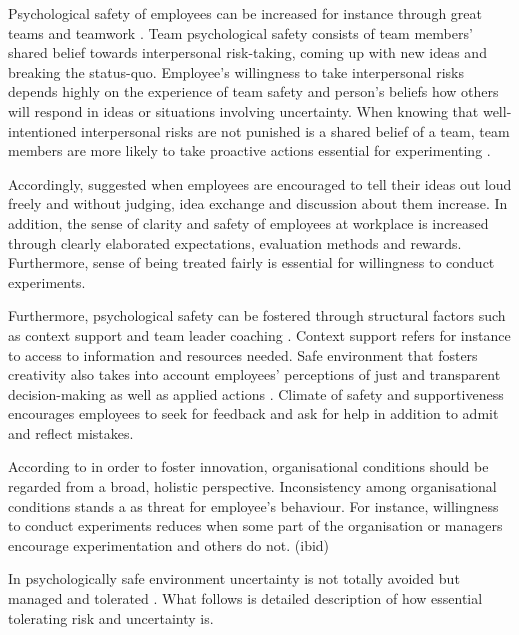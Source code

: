 Psychological safety of employees can be increased for instance through great teams and teamwork \citep{edmondson1999psychological}. Team psychological safety consists of team members' shared belief towards interpersonal risk-taking, coming up with new ideas and breaking the status-quo. Employee's willingness to take interpersonal risks depends highly on the experience of team safety and person's beliefs how others will respond in ideas or situations involving uncertainty. \citep{edmondson1999psychological,farson2002failuretolerantleader} When knowing that well-intentioned interpersonal risks are not punished is a shared belief of a team, team members are more likely to take proactive actions essential for experimenting \citep{garvin2008yours}.

Accordingly, \citet{amabile1998kill} suggested when employees are encouraged to tell their ideas out loud freely and without judging, idea exchange and discussion about them increase. In addition, the sense of clarity and safety of employees at workplace is increased through clearly elaborated expectations, evaluation methods and rewards. Furthermore, sense of being treated fairly is essential for willingness to conduct experiments. \citep{shalley2004leaders}

Furthermore, psychological safety can be fostered through structural factors such as context support and team leader coaching \citep{hackman1987design,edmondson1999psychological}. Context support refers for instance to access to information and resources needed. Safe environment that fosters creativity also takes into account employees' perceptions of just and transparent decision-making as well as applied actions \citep{shalley2004leaders}. Climate of safety and supportiveness encourages employees to seek for feedback and ask for help in addition to admit and reflect mistakes. \citep{edmondson1999psychological} 

According to \citet{lee2004mixed} in order to foster innovation, organisational conditions should be regarded from a broad, holistic perspective. Inconsistency among organisational conditions stands a as threat for employee's behaviour. For instance, willingness to conduct experiments reduces when some part of the organisation or managers encourage experimentation and others do not. (ibid)

In psychologically safe environment uncertainty is not totally avoided but managed and tolerated \citep{shalley2004leaders}. What follows is detailed description of how essential tolerating risk and uncertainty is. 


